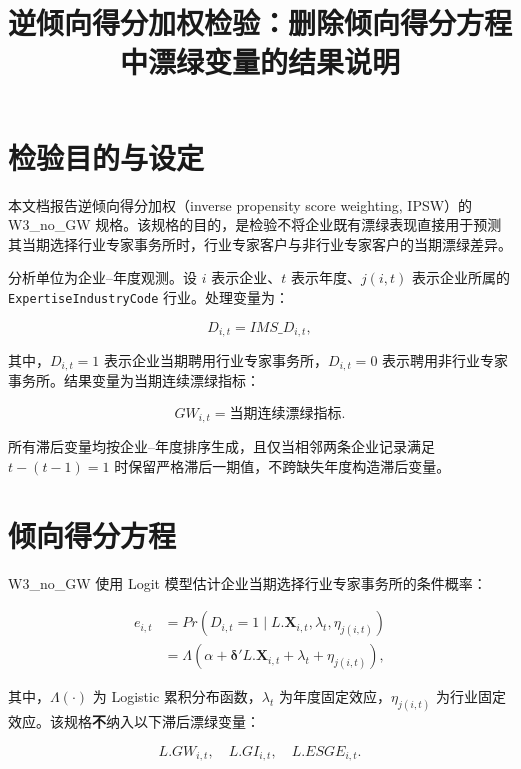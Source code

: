 \documentclass[12pt,a4paper]{article}
\title{逆倾向得分加权检验：删除倾向得分方程中漂绿变量的结果说明}
\author{}
\date{}
\begin{document}
\maketitle

\section{检验目的与设定}

本文档报告逆倾向得分加权（inverse propensity score weighting, IPSW）的 W3\_no\_GW 规格。该规格的目的，是检验不将企业既有漂绿表现直接用于预测其当期选择行业专家事务所时，行业专家客户与非行业专家客户的当期漂绿差异。

分析单位为企业--年度观测。设 $i$ 表示企业、$t$ 表示年度、$j(i,t)$ 表示企业所属的 \texttt{ExpertiseIndustryCode} 行业。处理变量为：

\begin{equation}
D_{i,t}=IMS\_D_{i,t},
\end{equation}

其中，$D_{i,t}=1$ 表示企业当期聘用行业专家事务所，$D_{i,t}=0$ 表示聘用非行业专家事务所。结果变量为当期连续漂绿指标：

\begin{equation}
GW_{i,t}=\text{当期连续漂绿指标}.
\end{equation}

所有滞后变量均按企业--年度排序生成，且仅当相邻两条企业记录满足 $t-(t-1)=1$ 时保留严格滞后一期值，不跨缺失年度构造滞后变量。

\section{倾向得分方程}

W3\_no\_GW 使用 Logit 模型估计企业当期选择行业专家事务所的条件概率：

\begin{equation}
\begin{aligned}
e_{i,t}
&=Pr(D_{i,t}=1\mid L.\mathbf{X}_{i,t},\lambda_t,\eta_{j(i,t)})\\
&=\Lambda\left(
\alpha+\boldsymbol{\delta}'L.\mathbf{X}_{i,t}
+\lambda_t+\eta_{j(i,t)}
\right),
\end{aligned}
\end{equation}

其中，$\Lambda(\cdot)$ 为 Logistic 累积分布函数，$\lambda_t$ 为年度固定效应，$\eta_{j(i,t)}$ 为行业固定效应。该规格\textbf{不}纳入以下滞后漂绿变量：

\begin{equation}
L.GW_{i,t},\quad L.GI_{i,t},\quad L.ESGE_{i,t}.
\end{equation}
\end{document}
